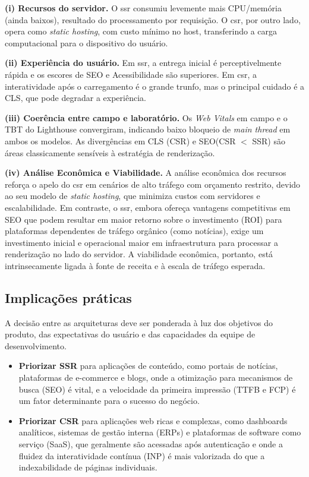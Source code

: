 {\textbf{(i) Recursos do servidor.} O \acrshort{ssr} consumiu levemente mais CPU/memória (ainda baixos), resultado do processamento por requisição. O \acrshort{csr}, por outro lado, opera como \emph{static hosting}, com custo mínimo no host, transferindo a carga computacional para o dispositivo do usuário.

\textbf{(ii) Experiência do usuário.} Em \acrshort{ssr}, a entrega inicial é perceptivelmente rápida e os escores de SEO e Acessibilidade são superiores. Em \acrshort{csr}, a interatividade após o carregamento é o grande trunfo, mas o principal cuidado é a CLS, que pode degradar a experiência.

\textbf{(iii) Coerência entre campo e laboratório.} Os \textit{Web Vitals} em campo e o TBT do Lighthouse convergiram, indicando baixo bloqueio de \emph{main thread} em ambos os modelos. As divergências em CLS (CSR) e SEO(CSR $<$ SSR) são áreas classicamente sensíveis à estratégia de renderização.

\textbf{(iv) Análise Econômica e Viabilidade.} A análise econômica dos recursos reforça o apelo do \acrshort{csr} em cenários de alto tráfego com orçamento restrito, devido ao seu modelo de \emph{static hosting}, que minimiza custos com servidores e escalabilidade. Em contraste, o \acrshort{ssr}, embora ofereça vantagens competitivas em SEO que podem resultar em maior retorno sobre o investimento (ROI) para plataformas dependentes de tráfego orgânico (como notícias), exige um investimento inicial e operacional maior em infraestrutura para processar a renderização no lado do servidor. A viabilidade econômica, portanto, está intrinsecamente ligada à fonte de receita e à escala de tráfego esperada.

\subsection{Implicações práticas}
A decisão entre as arquiteturas deve ser ponderada à luz dos objetivos do produto, das expectativas do usuário e das capacidades da equipe de desenvolvimento.
\begin{itemize}
    \item \textbf{Priorizar SSR} para aplicações de conteúdo, como portais de notícias, plataformas de e-commerce e blogs, onde a otimização para mecanismos de busca (SEO) é vital, e a velocidade da primeira impressão (TTFB e FCP) é um fator determinante para o sucesso do negócio.
    \item \textbf{Priorizar CSR} para aplicações web ricas e complexas, como dashboards analíticos, sistemas de gestão interna (ERPs) e plataformas de software como serviço (SaaS), que geralmente são acessadas após autenticação e onde a fluidez da interatividade contínua (INP) é mais valorizada do que a indexabilidade de páginas individuais.
\end{itemize}

}
